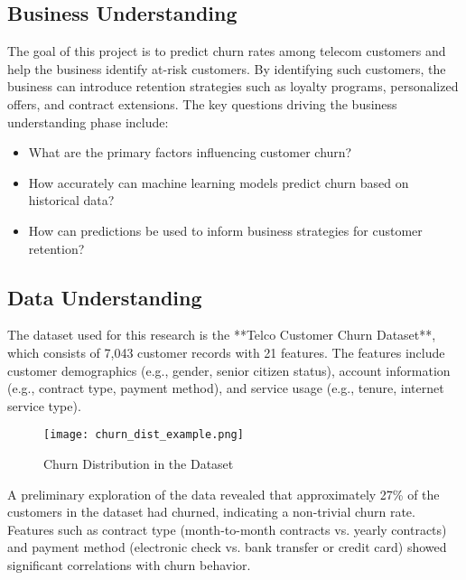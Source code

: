 \documentclass[12pt]{article}
\begin{document}
\subsection{Business Understanding}
The goal of this project is to predict churn rates among telecom customers and help the business identify at-risk customers. By identifying such customers, the business can introduce retention strategies such as loyalty programs, personalized offers, and contract extensions. The key questions driving the business understanding phase include:
\begin{itemize}
    \item What are the primary factors influencing customer churn?
    \item How accurately can machine learning models predict churn based on historical data?
    \item How can predictions be used to inform business strategies for customer retention?
\end{itemize}

\subsection{Data Understanding}
The dataset used for this research is the **Telco Customer Churn Dataset**, which consists of 7,043 customer records with 21 features. The features include customer demographics (e.g., gender, senior citizen status), account information (e.g., contract type, payment method), and service usage (e.g., tenure, internet service type).

\begin{figure}[H]
    \centering
    \texttt{[image: churn\_dist\_example.png]}
    \caption{Churn Distribution in the Dataset}
    \label{fig:churn_distribution}
\end{figure}

A preliminary exploration of the data revealed that approximately 27\% of the customers in the dataset had churned, indicating a non-trivial churn rate. Features such as contract type (month-to-month contracts vs. yearly contracts) and payment method (electronic check vs. bank transfer or credit card) showed significant correlations with churn behavior.
\end{document}
